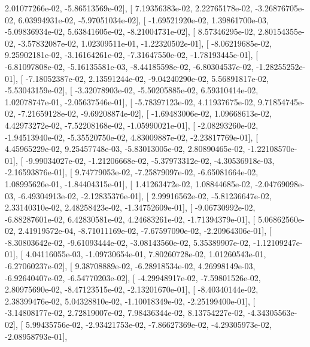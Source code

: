 \documentclass{article}
\begin{document}
          2.01077266e-02,  -5.86513569e-02],
       [  7.19356383e-02,   2.22765178e-02,  -3.26876705e-02,
          6.03994931e-02,  -5.97051034e-02],
       [ -1.69521920e-02,   1.39861700e-03,  -5.09836934e-02,
          5.63841605e-02,  -8.21004731e-02],
       [  8.57346295e-02,   2.80154355e-02,  -3.57832087e-02,
          1.02309511e-01,  -1.22320502e-01],
       [ -8.06219685e-02,   9.25902181e-02,  -3.16164261e-02,
         -7.31647550e-02,  -1.78193445e-01],
       [ -6.81097808e-02,  -5.16135581e-03,  -8.44185598e-02,
         -6.80304537e-02,  -1.28255252e-01],
       [ -7.18052387e-02,   2.13591244e-02,  -9.04240290e-02,
          5.56891817e-02,  -5.53043159e-02],
       [ -3.32078903e-02,  -5.50205885e-02,   6.59310414e-02,
          1.02078747e-01,  -2.05637546e-01],
       [ -5.78397123e-02,   4.11937675e-02,   9.71854745e-02,
         -7.21659128e-02,  -9.69208874e-02],
       [ -1.69483006e-02,   1.09668613e-02,   4.42973272e-02,
         -7.52208168e-02,  -1.05990021e-01],
       [ -2.08293260e-02,  -1.94513940e-02,  -5.35520750e-02,
          4.83009887e-02,  -2.23817769e-01],
       [  4.45965229e-02,   9.25457748e-03,  -5.83013005e-02,
          2.80890465e-02,  -1.22108570e-01],
       [ -9.99034027e-02,  -1.21206668e-02,  -5.37973312e-02,
         -4.30536918e-03,  -2.16593876e-01],
       [  9.74779053e-02,  -7.25879097e-02,  -6.65081664e-02,
          1.08995626e-01,  -1.84404315e-01],
       [  1.41263472e-02,   1.08844685e-02,  -2.04769098e-03,
         -6.49304913e-02,  -2.12835376e-01],
       [  2.99916562e-02,  -5.81236647e-02,   2.33140310e-02,
          2.48258423e-02,  -1.34752609e-01],
       [ -9.06730992e-02,  -6.88287601e-02,   6.42830581e-02,
          4.24683261e-02,  -1.71394379e-01],
       [  5.06862560e-02,   2.41919572e-04,  -8.71011169e-02,
         -7.67597090e-02,  -2.20964306e-01],
       [ -8.30803642e-02,  -9.61093444e-02,  -3.08143560e-02,
          5.35389907e-02,  -1.12109247e-01],
       [  4.04116055e-03,  -1.09730654e-01,   7.80260728e-02,
          1.01260543e-01,  -6.27060237e-02],
       [  9.38708889e-02,  -6.28918534e-02,   4.26998149e-03,
         -6.92640407e-02,  -6.54770203e-02],
       [ -4.29948917e-02,  -7.59801526e-02,   2.80975690e-02,
         -8.47123515e-02,  -2.13201670e-01],
       [ -8.40340144e-02,   2.38399476e-02,   5.04328810e-02,
         -1.10018349e-02,  -2.25199400e-01],
       [ -3.14808177e-02,   2.72819007e-02,   7.98436344e-02,
          8.13754227e-02,  -4.34305563e-02],
       [  5.99435756e-02,  -2.93421753e-02,  -7.86627369e-02,
         -4.29305973e-02,  -2.08958793e-01],
\end{document}
